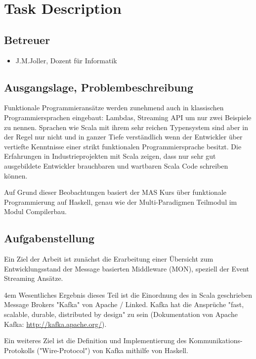 \chapter{Task Description}
\section{Betreuer}
\begin{itemize}
    \item J.M.Joller, Dozent für Informatik
\end{itemize}

\section{Ausgangslage, Problembeschreibung}
Funktionale Programmieransätze werden zunehmend auch in klassischen
Programmiersprachen eingebaut:  Lambdas, Streaming API um nur zwei Beispiele zu
nennen. Sprachen wie Scala mit ihrem sehr reichen Typensystem sind aber in der
Regel nur nicht und in ganzer Tiefe verständlich wenn der Entwickler über
vertiefte Kenntnisse einer strikt funktionalen Programmiersprache besitzt. Die
Erfahrungen in Industrieprojekten mit Scala zeigen, dass nur sehr gut
ausgebildete Entwickler brauchbaren und wartbaren Scala Code schreiben können. 

Auf Grund dieser Beobachtungen basiert der MAS Kurs über funktionale
Programmierung auf Haskell, genau wie der Multi-Paradigmen Teilmodul im Modul
Compilerbau.

\section{Aufgabenstellung}
Ein Ziel der Arbeit ist zunächst die Erarbeitung einer Übersicht zum
Entwicklungsstand der Message basierten Middleware (MON), speziell der Event
Streaming Ansätze. 

\par
\begingroup
\leftskip4em
\rightskip\leftskip
Wesentliches Ergebnis dieses Teil ist die Einordnung des in Scala geschrieben
Message Brokers "Kafka" von Apache / Linked. Kafka hat die Ansprüche "fast,
scalable, durable, distributed by design" zu sein (Dokumentation von Apache
Kafka: \url{http://kafka.apache.org/}).
\par
\endgroup

Ein weiteres  Ziel ist die Definition und Implementierung des
Kommunikations-Protokolls ("Wire-Protocol") von Kafka mithilfe von Haskell.

